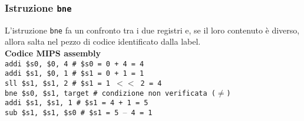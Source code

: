 \documentclass[../main.tex]{subfiles}
\begin{document}
\subsubsection{Istruzione \texttt{bne}}
L'istruzione \texttt{bne} fa un confronto tra i due registri e, se il loro contenuto
è diverso, allora salta nel pezzo di codice identificato dalla label.
\\[2mm]
\textbf{Codice MIPS assembly} \\
\texttt{addi \$s0, \$0, 4 \hspace*{0cm} \hspace*{0cm} \hspace*{0cm} \hspace*{0cm} \hspace*{0cm} \hspace*{0cm} \# \$s0 = 0 + 4 = 4} \\
\texttt{addi \$s1, \$0, 1 \hspace*{0cm} \hspace*{0cm} \hspace*{0cm} \hspace*{0cm} \hspace*{0cm} \hspace*{0cm} \# \$s1 = 0 + 1 = 1} \\
\texttt{sll \$s1, \$s1, 2 \hspace*{0cm} \hspace*{0cm} \hspace*{0cm} \hspace*{0cm} \hspace*{0cm} \hspace*{0cm} \# \$s1 = 1 $<<$ 2 = 4} \\
\texttt{bne \$s0, \$s1, target \hspace*{0cm} \# condizione non verificata ($\neq$)} \\
\texttt{addi \$s1, \$s1, 1 \hspace*{0cm} \hspace*{0cm} \hspace*{0cm} \hspace*{0cm} \hspace*{0cm} \# \$s1 = 4 + 1 = 5} \\
\texttt{sub \$s1, \$s1, \$s0 \hspace*{0cm} \hspace*{0cm} \hspace*{0cm} \hspace*{0cm} \# \$s1 = 5 $–$ 4 = 1} \\
\\
\end{document}
